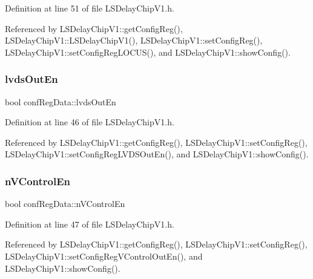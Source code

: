 Definition at line 51 of file L\+S\+Delay\+Chip\+V1.\+h.



Referenced by L\+S\+Delay\+Chip\+V1\+::get\+Config\+Reg(), L\+S\+Delay\+Chip\+V1\+::\+L\+S\+Delay\+Chip\+V1(), L\+S\+Delay\+Chip\+V1\+::set\+Config\+Reg(), L\+S\+Delay\+Chip\+V1\+::set\+Config\+Reg\+L\+O\+C\+U\+S(), and L\+S\+Delay\+Chip\+V1\+::show\+Config().

\mbox{\label{structconfRegData_a709d8d691ef0c8ea5c4c03aac3d851f1}} 
\subsubsection{\texorpdfstring{lvds\+Out\+En}{lvdsOutEn}}
{\footnotesize\ttfamily bool conf\+Reg\+Data\+::lvds\+Out\+En}



Definition at line 46 of file L\+S\+Delay\+Chip\+V1.\+h.



Referenced by L\+S\+Delay\+Chip\+V1\+::get\+Config\+Reg(), L\+S\+Delay\+Chip\+V1\+::set\+Config\+Reg(), L\+S\+Delay\+Chip\+V1\+::set\+Config\+Reg\+L\+V\+D\+S\+Out\+En(), and L\+S\+Delay\+Chip\+V1\+::show\+Config().

\mbox{\label{structconfRegData_a62f72429bde3ede255f6d8dfe1401c37}} 
\subsubsection{\texorpdfstring{n\+V\+Control\+En}{nVControlEn}}
{\footnotesize\ttfamily bool conf\+Reg\+Data\+::n\+V\+Control\+En}



Definition at line 47 of file L\+S\+Delay\+Chip\+V1.\+h.



Referenced by L\+S\+Delay\+Chip\+V1\+::get\+Config\+Reg(), L\+S\+Delay\+Chip\+V1\+::set\+Config\+Reg(), L\+S\+Delay\+Chip\+V1\+::set\+Config\+Reg\+V\+Control\+Out\+En(), and L\+S\+Delay\+Chip\+V1\+::show\+Config().

\mbox{\label{structconfRegData_a4e98d082c44e34995224bd242da493d0}} 
